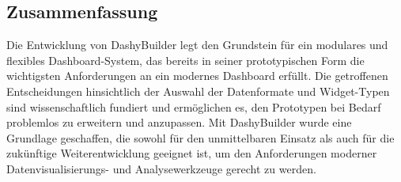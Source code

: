 \documentclass[a4paper, 12pt]{scrartcl}
\begin{document}
\subsection{Zusammenfassung}
Die Entwicklung von DashyBuilder legt den Grundstein für ein modulares und flexibles Dashboard-System, das bereits in seiner prototypischen Form die wichtigsten Anforderungen an ein modernes Dashboard erfüllt. Die getroffenen Entscheidungen hinsichtlich der Auswahl der Datenformate und Widget-Typen sind wissenschaftlich fundiert und ermöglichen es, den Prototypen bei Bedarf problemlos zu erweitern und anzupassen. Mit DashyBuilder wurde eine Grundlage geschaffen, die sowohl für den unmittelbaren Einsatz als auch für die zukünftige Weiterentwicklung geeignet ist, um den Anforderungen moderner Datenvisualisierungs- und Analysewerkzeuge gerecht zu werden.


 

		
    
\intextsep 5pt




\newpage
{}
\setcounter{page}{4}

\newpage
\nocite{*} %
\printbibliography[heading=bibnumbered, title={Literaturverzeichnis}, notkeyword=verwendet] %













\end{document}
